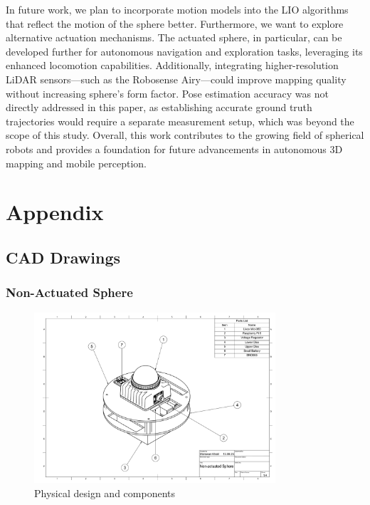 \documentclass[english, bachelor, utf8]{base/thesis_telematics}
\begin{document}
In future work, we plan to incorporate motion models into the LIO algorithms that reflect the motion of the sphere better.
Furthermore, we want to explore alternative actuation mechanisms.
The actuated sphere, in particular, can be developed further for autonomous navigation and exploration tasks, leveraging its enhanced locomotion capabilities. 
Additionally, integrating higher-resolution LiDAR sensors—such as the Robosense Airy—could improve mapping quality without increasing sphere's form factor. 
Pose estimation accuracy was not directly addressed in this paper, as establishing accurate ground truth trajectories would require a separate measurement setup, which was beyond the scope of this study.
Overall, this work contributes to the growing field of spherical robots and provides a foundation for future advancements in autonomous 3D mapping and mobile perception.
\chapter{Appendix}

\section{CAD Drawings}
\subsection{Non-Actuated Sphere}
\label{sec:complete-structure}
\clearpage %

\begin{figure}[H]
\centering
\includegraphics[width=0.80\textwidth,page=1]{pics/Non_actuated_Sphere_drawing.pdf}
\caption{Physical design and components}
\label{fig:system_page1}
\end{figure}
\end{document}
